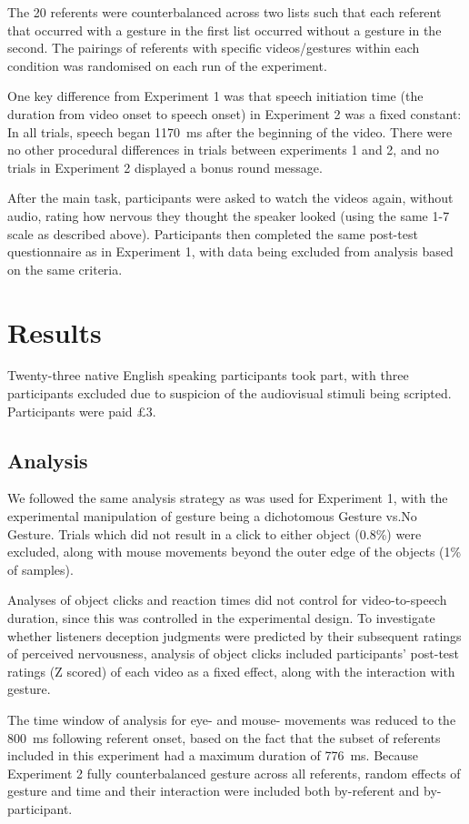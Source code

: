\documentclass[a4paper,man,natbib]{apa6}
\begin{document}
The 20 referents were counterbalanced across two lists such that each referent that occurred with a gesture in the first list occurred without a gesture in the second.
The pairings of referents with specific videos/gestures within each condition was randomised on each run of the experiment.

One key difference from Experiment 1 was that speech initiation time (the duration from video onset to speech onset) in Experiment 2 was a fixed constant: In all trials, speech began 1170~ms after the beginning of the video.
There were no other procedural differences in trials between experiments 1 and 2, and no trials in Experiment 2 displayed a bonus round message. 

After the main task, participants were asked to watch the videos again, without audio, rating how nervous they thought the speaker looked (using the same 1-7 scale as described above).
Participants then completed the same post-test questionnaire as in Experiment 1, with data being excluded from analysis based on the same criteria.

\section{Results}
Twenty-three native English speaking participants took part, with three participants excluded due to suspicion of the audiovisual stimuli being scripted.
Participants were paid \pounds{}3.

\subsection{Analysis}
We followed the same analysis strategy as was used for Experiment 1, with the experimental manipulation of gesture being a dichotomous Gesture vs.\@ No Gesture.
Trials which did not result in a click to either object (0.8\%) were excluded, along with mouse movements beyond the outer edge of the objects (1\% of samples).

Analyses of object clicks and reaction times did not control for video-to-speech duration, since this was controlled in the experimental design.
To investigate whether listeners deception judgments were predicted by their subsequent ratings of perceived nervousness, analysis of object clicks included participants' post-test ratings (Z scored) of each video as a fixed effect, along with the interaction with gesture.

The time window of analysis for eye- and mouse- movements was reduced to the 800~ms following referent onset, based on the fact that the subset of referents included in this experiment had a maximum duration of 776~ms. 
Because Experiment 2 fully counterbalanced gesture across all referents, random effects of gesture and time and their interaction were included both by-referent and by-participant.
\end{document}
